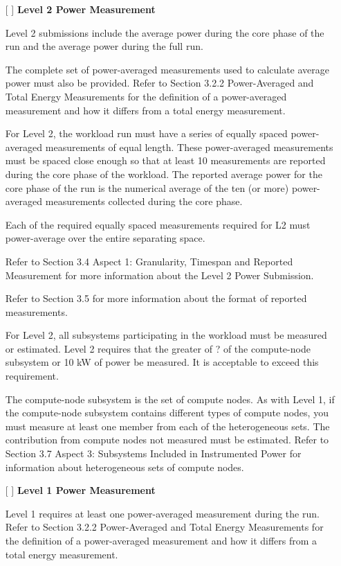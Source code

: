 \begin{itemize}
\newpage
\item[{[ ]}]
\textbf{Level 2 Power Measurement}

Level 2 submissions include the average power during the core phase of the run and the average power during the full run.

The complete set of power-averaged measurements used to calculate average power must also be provided. Refer to Section 3.2.2 Power-Averaged and Total Energy Measurements for the definition of a power-averaged measurement and how it differs from a total energy measurement.

For Level 2, the workload run must have a series of equally spaced power-averaged measurements of equal length. These power-averaged measurements must be spaced close enough so that at least 10 measurements are reported during the core phase of the workload. The reported average power for the core phase of the run is the numerical average of the ten (or more) power-averaged measurements collected during the core phase.

Each of the required equally spaced measurements required for L2 must power-average over the entire separating space. 

Refer to Section 3.4 Aspect 1: Granularity, Timespan and Reported Measurement for more information about the Level 2 Power Submission. 

Refer to Section 3.5 for more information about the format of reported measurements.

For Level 2, all subsystems participating in the workload must be measured or estimated. Level 2 requires that the greater of ? of the compute-node subsystem or 10 kW of power be measured. It is acceptable to exceed this requirement.

The compute-node subsystem is the set of compute nodes. As with Level 1, if the compute-node subsystem contains different types of compute nodes, you must measure at least one member from each of the heterogeneous sets. The contribution from compute nodes not measured must be estimated. Refer to Section 3.7 Aspect 3: Subsystems Included in Instrumented Power for information about heterogeneous sets of compute nodes.


\newpage
\item[{[ ]}]
\textbf{Level 1 Power Measurement}

Level 1 requires at least one power-averaged measurement during the run. Refer to Section 3.2.2 Power-Averaged and Total Energy Measurements for the definition of a power-averaged measurement and how it differs from a total energy measurement.


\end{itemize}
